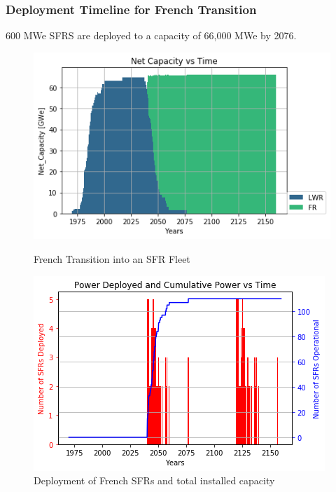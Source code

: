 \begin{frame}
	\frametitle{Deployment Timeline for French Transition}
	600 MWe SFRS are deployed to a capacity of 66,000 MWe by 2076.
	\begin{figure}[htbp!]
	\begin{minipage}[b]{.45\linewidth}
        \begin{center}
                \includegraphics[width=\textwidth]{./images/french-transition/power_plot.png}
        \end{center}
        \caption{French Transition into an SFR Fleet}
        \label{fig:sfr_num}
	\end{minipage}
	\hspace{.5cm}
	\begin{minipage}[b]{.45\linewidth}
		\centering
		\includegraphics[width=\textwidth]{./images/french-transition/sfr_deploy.png}
		\caption{Deployment of French \glspl{SFR} and total installed capacity}
		\label{fig:dep}
	\end{minipage}
\end{figure}
\end{frame}